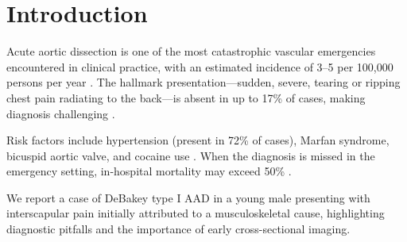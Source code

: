 \section{Introduction}

Acute aortic dissection is one of the most catastrophic vascular emergencies encountered in
clinical practice, with an estimated incidence of 3--5 per 100{,}000 persons per year
\cite{erbel2014}. The hallmark presentation—sudden, severe, tearing or ripping chest pain
radiating to the back—is absent in up to 17\% of cases, making diagnosis challenging
\cite{meszaros2000}.

Risk factors include hypertension (present in 72\% of cases), Marfan syndrome, bicuspid aortic
valve, and cocaine use \cite{nienaber2016}. When the diagnosis is missed in the emergency
setting, in-hospital mortality may exceed 50\% \cite{bossone2018}.

We report a case of DeBakey type I AAD in a young male presenting with interscapular pain
initially attributed to a musculoskeletal cause, highlighting diagnostic pitfalls and the
importance of early cross-sectional imaging.

